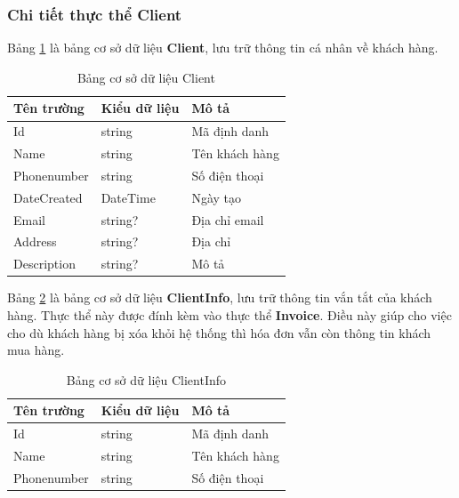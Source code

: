 \documentclass[../DoAn.tex]{subfiles}
\begin{document}
\subsubsection{Chi tiết thực thể Client}
\label{subsubsection:detaildesign-database-client}
Bảng \ref{table:database_client} là bảng cơ sở dữ liệu \textbf{Client}, lưu trữ thông tin cá nhân về khách hàng.
\begin{table}[H]
    \centering
    \begin{tabularx}{\textwidth}{|p{4cm}|p{3cm}|X|}
        \hline
        \textbf{Tên trường} & \textbf{Kiểu dữ liệu} & \textbf{Mô tả} \\ \hline
        Id                  & string                & Mã định danh   \\ \hline
        Name                & string                & Tên khách hàng \\ \hline
        Phonenumber         & string                & Số điện thoại  \\ \hline
        DateCreated         & DateTime              & Ngày tạo       \\ \hline
        Email               & string?               & Địa chỉ email  \\ \hline
        Address             & string?               & Địa chỉ        \\ \hline
        Description         & string?               & Mô tả          \\ \hline
    \end{tabularx}
    \caption{Bảng cơ sở dữ liệu Client}
    \label{table:database_client}
\end{table}

Bảng \ref{table:database_clientinfo} là bảng cơ sở dữ liệu \textbf{ClientInfo}, lưu trữ thông tin vắn tắt của khách hàng. Thực thể này được đính kèm vào thực thể \textbf{Invoice}. Điều này giúp cho việc cho dù khách hàng bị xóa khỏi hệ thống thì hóa đơn vẫn còn thông tin khách mua hàng.
\begin{table}[H]
    \centering
    \begin{tabularx}{\textwidth}{|p{4cm}|p{3cm}|X|}
        \hline
        \textbf{Tên trường} & \textbf{Kiểu dữ liệu} & \textbf{Mô tả} \\ \hline
        Id                  & string                & Mã định danh   \\ \hline
        Name                & string                & Tên khách hàng \\ \hline
        Phonenumber         & string                & Số điện thoại  \\ \hline
    \end{tabularx}
    \caption{Bảng cơ sở dữ liệu ClientInfo}
    \label{table:database_clientinfo}
\end{table}
\break
\end{document}
